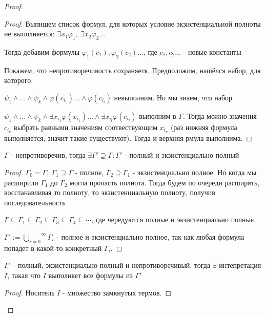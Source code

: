 \begin{proof}
    \begin{proof}
        Выпишем список формул, для которых условие экзистенциальной полноты не выполняется:
        $\exists x_1 \varphi_1,\ \exists x_2 \varphi_2 \dots$

        Тогда добавим формулы $\varphi_1(c_1), \varphi_2(c_2) \dots$, где $c_1, c_2 \dots$ - новые константы

        Покажем, что непротиворечивость сохраняетя. Предположим, нашёлся набор, для которого

        $\psi_1 \land \dots \land \psi_k \land \varphi(c_{i_1}) \dots \land \varphi(c_{i_l})$ невыполним. Но мы знаем, что набор

        $\psi_1 \land \dots \land \psi_k \land \exists x_{i_1} \varphi(x_{i_1}) \dots \land  \exists x_{i_l} \varphi(c_{i_l})$ выполним в $\Gamma$. Тогда можно значения $c_{i_k}$ выбрать равными
        значениям соотвествующим $x_{i_k}$ (раз нижняя формула выполняется, значит такие существуют). Тогда и верхняя рмула выполнима.
    \end{proof}

\begin{lemma}
    $\Gamma$ - непротиворечив, тогда $\exists \Gamma' \supseteq \Gamma : \Gamma'$ - полный и экзистенциально полный
\end{lemma}

\begin{proof}
    $\Gamma_0 = \Gamma,\ \Gamma_1 \supseteq \Gamma$ - полное, $\Gamma_2 \supseteq \Gamma_1$ - экзистенциально полное. Но когда мы
    расширили $\Gamma_1$ до $\Gamma_2$ могла пропасть полнота. Тогда будем по очереди расширять, восстанавливая то полноту, то экзистенциальную полноту, получив последовательность

    $\Gamma \subseteq \Gamma_1 \subseteq \Gamma_2 \subseteq \Gamma_3 \subseteq \Gamma_4 \subseteq \cdots$, где чередуются полные и экзистенциально полные.

    $\Gamma' := \overset{\infty}{\underset{i = 0}{\bigcup}} \Gamma_i$ - полное и экзистенциально полное, так как любая формула попадет в какой-то конкретный $\Gamma_i$.
\end{proof}

\begin{lemma}
    $\Gamma'$ - полный, экзистенциально полный и непротиворечивый, тогда $\exists$ интепретация
    $I$, такая что $I$ выполняет все формулы из $\Gamma'$ 
\end{lemma}

\begin{proof}
    Носитель $I$ - множество замкнутых термов.


\end{proof}
\end{proof}
